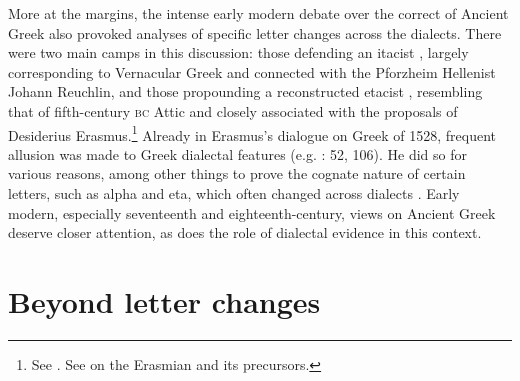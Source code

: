 More at the margins, the intense early modern debate over the correct  of Ancient Greek also provoked analyses of specific letter changes across the dialects. There were two main camps in this discussion: those defending an itacist , largely corresponding to Vernacular Greek  and connected with the Pforzheim Hellenist Johann Reuchlin, and those propounding a reconstructed etacist , resembling that of fifth-century \textsc{bc} Attic and closely associated with the proposals of Desiderius Erasmus.\footnote{See \citet[130]{Sandys1908}. See \citet{Bywater1908} on the Erasmian  and its precursors.} Already in Erasmus’s dialogue on Greek  of 1528, frequent allusion was made to Greek dialectal features (e.g. \citealt{Erasmus1528}: 52, 106). He did so for various reasons, among other things to prove the cognate nature of certain letters, such as alpha and eta, which often changed across dialects \citep[62]{Erasmus1528}. Early modern, especially seventeenth and eighteenth-century, views on Ancient Greek  deserve closer attention, as does the role of dialectal evidence in this context.

\section{Beyond letter changes}\label{sec:6.3}

